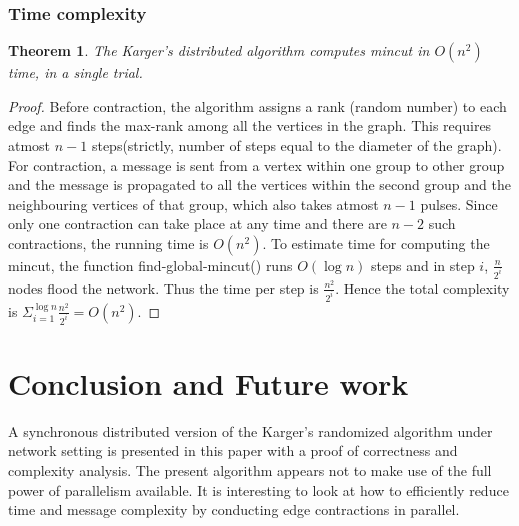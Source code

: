 \documentclass{acm_proc_article-sp}
\begin{document}
\subsubsection{Time complexity}
\newtheorem{mydef15}[mydef14]{Theorem}
\begin{mydef15}
The Karger's distributed algorithm computes mincut in $O(n^{2})$ time, in a single trial.
\end{mydef15}

\begin{proof}
Before contraction, the algorithm assigns a rank (random number) to each edge and finds the max-rank among all the vertices in the graph. This requires atmost $n-1$ steps(strictly, number of steps equal to the diameter of the graph). For contraction, a message is sent from a vertex within one group to other group and the message is propagated to all the vertices within the second group and the neighbouring vertices of that group, which also takes atmost $n-1$ pulses. Since only one contraction can take place at any time and there are $n-2$ such contractions, the running time is $O(n^{2})$.  To estimate time for computing the mincut, the function find-global-mincut() runs $O(\log{n})$ steps and in step $i$, $\frac{n}{2^{i}}$ nodes flood the network. Thus the time per step is  $\frac{n^{2}}{2^{i}}$. Hence the total complexity is $\Sigma_{i=1}^{\log{n}} \frac{n^{2}}{2^{i}} = O(n^{2})$.
\end{proof}

\section{Conclusion and Future work}
A synchronous distributed version of the Karger's randomized algorithm under network setting is presented in this paper with a proof of correctness and complexity analysis. The present algorithm appears not to make use of the full power of parallelism available. It is interesting to look at how to efficiently reduce time and message complexity by conducting edge contractions in parallel.



  
\end{document}
